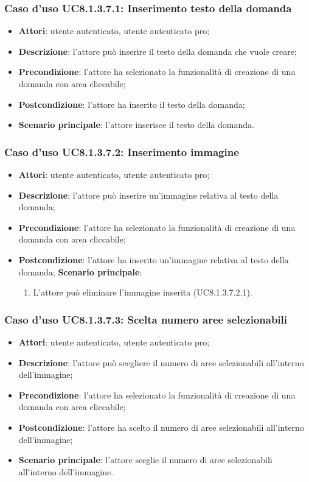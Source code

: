 \subsubsection{Caso d'uso UC8.1.3.7.1: Inserimento testo della domanda}
\begin{itemize}
	\item \textbf{Attori}: utente autenticato, utente autenticato pro;
	\item \textbf{Descrizione}: l'attore può inserire il testo della domanda che vuole creare;
	\item \textbf{Precondizione}: l'attore ha selezionato la funzionalità di creazione di una domanda con area cliccabile;
	\item \textbf{Postcondizione}: l'attore ha inserito il testo della domanda;
	\item \textbf{Scenario principale}: l'attore inserisce il testo della domanda. 
\end{itemize}

\subsubsection{Caso d'uso UC8.1.3.7.2: Inserimento immagine}
\begin{itemize}
	\item \textbf{Attori}: utente autenticato, utente autenticato pro;
	\item \textbf{Descrizione}: l'attore può inserire un'immagine relativa al testo della domanda;
	\item \textbf{Precondizione}: l'attore ha selezionato la funzionalità di creazione di una domanda con area cliccabile; 
	\item \textbf{Postcondizione}: l'attore ha inserito un'immagine relativa al testo della domanda;
	\textbf{Scenario principale}: 
			\begin{enumerate}
				\item L'attore può eliminare l'immagine inserita (UC8.1.3.7.2.1).	
			\end{enumerate}						
	\end{itemize}

\subsubsection{Caso d'uso UC8.1.3.7.3: Scelta numero aree selezionabili}
\begin{itemize}
	\item \textbf{Attori}: utente autenticato, utente autenticato pro;
	\item \textbf{Descrizione}: l'attore può scegliere il numero di aree selezionabili all'interno dell'immagine;
	\item \textbf{Precondizione}: l'attore ha selezionato la funzionalità di creazione di una domanda con area cliccabile; 
	\item \textbf{Postcondizione}: l'attore ha scelto il numero di aree selezionabili all'interno dell'immagine;
	\item \textbf{Scenario principale}: l'attore sceglie il numero di aree selezionabili all'interno dell'immagine. 	
\end{itemize}

